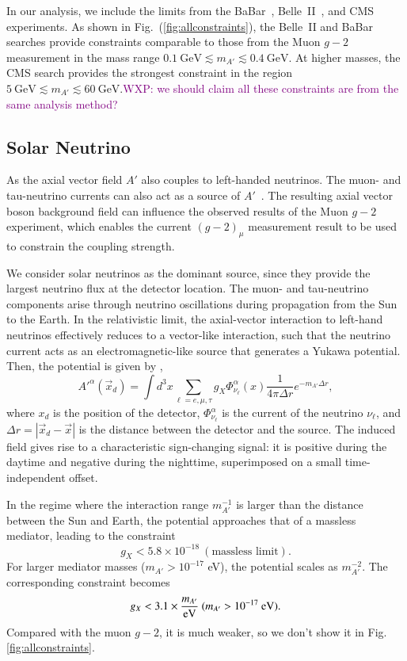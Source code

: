 \documentclass[onecolumn, aps, nofootinbib, prd, preprint, floats, floatfix, amsmath, amssymb, superscriptaddress, preprintnumbers]{revtex4-2}
\newcommand{\WXP}[1]{\textcolor{purple} {WXP: #1}}
\begin{document}
In our analysis, we include the limits from the BaBar~\cite{BaBar:2016sci}, Belle~II~\cite{Belle-II:2024wtd}, and CMS~\cite{CMS:2018yxg} experiments. As shown in Fig.~(\ref{fig:allconstraints}), the Belle~II and BaBar searches provide constraints comparable to those from the Muon $g-2$ measurement in the mass range $0.1~\mathrm{GeV}\lesssim m_{A'}\lesssim0.4~\mathrm{GeV}$. At higher masses, the CMS search provides the strongest constraint in the region$5~\mathrm{GeV}\lesssim m_{A'}\lesssim60~\mathrm{GeV}$.\WXP{we should claim all these constraints are from the same analysis method?}

\subsection{Solar Neutrino}
As the axial vector field $A'$ also couples to left-handed neutrinos. The muon- and tau-neutrino currents can also act as a source of $A'$~\cite{Fang:2025fvo}. The resulting axial vector boson background field can influence the observed results of the Muon $g-2$ experiment, which enables the current $(g-2)_\mu$ measurement result to be used to constrain the coupling strength. 

We consider solar neutrinos as the dominant source, since they provide the largest neutrino flux at the detector location. The muon- and tau-neutrino components arise through neutrino oscillations during propagation from the Sun to the Earth.
In the relativistic limit, the axial-vector interaction to left-hand neutrinos effectively reduces to a vector-like interaction, such that the neutrino current acts as an electromagnetic-like source that generates a Yukawa potential.
Then, the potential is given by \cite{Fang:2025fvo},
\begin{equation}
A'^{\alpha} (\vec{x}_d)= \int d^3 x \sum_{\ell = e, \mu, \tau} g_X { \Phi_{\nu_\ell}^{\alpha}(x) }\frac{1}{4 \pi \Delta r}  e^{-m_{A'} \Delta r},
\label{eq:axial-vector-potential}
\end{equation}
where $x_d$ is the position of the detector, $\Phi_{\nu_\ell}^{\alpha}$ is the current of the neutrino $\nu_\ell$, and $\Delta r = |\vec{x}_d - \vec{x}|$ is the distance between the detector and the source. The induced field gives rise to a characteristic sign-changing signal: it is positive during the daytime and negative during the nighttime, superimposed on a small time-independent offset.

In the regime where the interaction range $m^{-1}_{A'}$ is larger than the distance between the Sun and Earth, the potential approaches that of a massless mediator, leading to the constraint~\cite{Fang:2025fvo}
\begin{equation}
g_X < 5.8 \times 10^{-18}\  (\text{massless limit}). 
\end{equation}
For larger mediator masses ($m_{A'} > 10^{-17}$ eV), the potential scales as $m^{-2}_{A'}$. The corresponding constraint becomes~\cite{Fang:2025fvo}
\begin{equation}
g_X < 3.1 \times   \frac{ m_{A'}}{{\rm eV}}\ (m_{A'} > 10^{-17}\ \rm{eV}). 
\end{equation}
Compared with the muon $g-2$, it is much weaker, so we don't show it in Fig. \ref{fig:allconstraints}.
\end{document}
